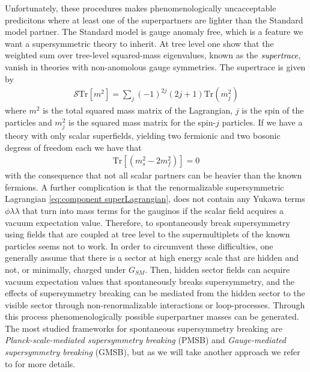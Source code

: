 Unfortunately, these procedures makes phenomenologically uncacceptable predicitons where at least one of the superpartners are lighter than the Standard model partner. The Standard model is gauge anomaly free, which is a feature we want a supersymmetric theory to inherit. At tree level one show that the weighted sum over tree-level squared-mass eigenvalues, known as the $\emph{supertrace}$, vanish in theories with non-anomolous gauge symmetries. The supertrace is given by
\begin{align}
    \mathcal{S}\text{Tr}[m^{2}]=\sum_{j}(-1)^{2j}(2j+1)\text{Tr}(m_{j}^{2})
\end{align}
where $m^{2}$ is the total squared mass matrix of the Lagrangian, $j$ is the spin of the particles and $m_{j}^{2}$ is the squared mass matrix for the spin-$j$ particles. If we have a theory with only scalar superfields, yielding two fermionic and two bosonic degress of freedom each we have that
\begin{align}
    \text{Tr}[(m_{s}^{2}-2m_{f}^{2})]=0
\end{align}
with the consequence that not all scalar partners can be heavier than the known fermions. A further complication is that the renormalizable supersymmetric Lagrangian \cref{eq:component superLagrangian}, does not contain any Yukawa terms $\phi\lambda\lambda$ that turn into mass terms for the gauginos if the scalar field acquires a vacuum expectation value. Therefore, to spontaneously break supersymmetry using fields that are coupled at tree level to the supermultiplets of the known particles seems not to work. In order to circumvent these difficulties, one generally assume that there is a sector at high energy scale that are hidden and not, or minimally, charged under $G_{SM}$. Then, hidden sector fields can acquire vacuum expectation values that spontaneously breaks supersymmetry, and the effects of supersymmetry breaking can be mediated from the hidden sector to the visible sector through non-renormalizable interactions or loop-processes. Through this process phenomenologically possible superpartner masses can be generated. The most studied frameworks for spontaneous supersymmetry breaking are \emph{Planck-scale-mediated supersymmetry breaking} (PMSB) and \emph{Gauge-mediated supersymmetry breaking} (GMSB), but as we will take another approach we refer to \cite{Martin:1997ns} for more details.


